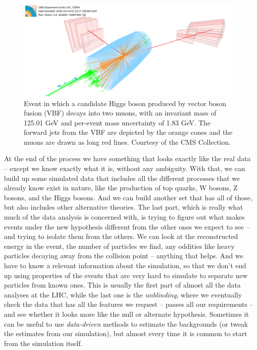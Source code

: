\begin{figure}
    \centering
     \includegraphics[width=\columnwidth]{gfx/ch2/HIG-19-006_VBF_white.png}
    \caption[CMS Event]{Event in which a candidate Higgs boson produced by vector boson fusion (VBF) decays into two muons, with an invariant mass of 125.01 GeV and per-event mass uncertainty of 1.83 GeV. The forward jets from the VBF are depicted by the orange cones and the muons are drawn as long red lines. Courtesy of the CMS Collection.}
    \label{fig:cmsev}
\end{figure}


At the end of the process we have something that looks exactly like the real data – except we know exactly what it is, without any ambiguity. With that, we can build up some simulated data that includes all the different processes that we already know exist in nature, like the production of top quarks, W bosons, Z bosons, and the Higgs bosons. And we can build another set that has all of those, but also includes other alternative theories. The last part, which is really what much of the data analysis is concerned with, is trying to figure out what makes events under the new hypothesis different from the other ones we expect to see – and trying to isolate them from the others. We can look at the reconstructed energy in the event, the number of particles we find, any oddities like heavy particles decaying away from the collision point – anything that helps. And we have to know a relevant information about the simulation, so that we don’t end up using properties of the events that are very hard to simulate to separate new particles from known ones. This is usually the first part of almost all the data analyses at the LHC, while the last one is the \emph{unblinding}, where we eventually check the data that has all the features we request – passes all our requirements – and see whether it looks more like the null or alternate hypothesis. Sometimes it can be useful to use \emph{data-driven} methods to estimate the backgrounds (or tweak the estimates from our simulation), but almost every time it is common to start from the simulation itself.

